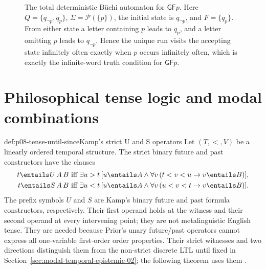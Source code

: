 \begin{figure}[!htbp]
\centering
{}
\caption{The total deterministic B\"uchi automaton for
\(\mathsf G\mathsf Fp\).  Here
\(Q=\{q_{\neg p},q_p\}\), \(\Sigma=\mathcal P(\{p\})\), the initial state is
\(q_{\neg p}\), and \(F=\{q_p\}\).  From either state a letter containing
\(p\) leads to \(q_p\), and a letter omitting \(p\) leads to
\(q_{\neg p}\).  Hence the unique run visits the accepting state infinitely
often exactly when \(p\) occurs infinitely often, which is exactly the
infinite-word truth condition for \(\mathsf G\mathsf Fp\).}
\label{fig:p08-buchi-gfp}
\end{figure}

\section[Philosophical tense logic]{Philosophical tense logic and modal combinations}

\begin{hbdefinition}{def:p08-tense-until-since}{Kamp's strict U and S operators}
Let \((T,<,V)\) be a linearly ordered temporal structure.  The strict binary
future and past constructors have the clauses
\[
\begin{aligned}
 t\entails U\,A\,B
 &\text{ iff }
 \exists u>t\,[u\entails A\land
   \forall v\,(t<v<u\to v\entails B)],\\
 t\entails S\,A\,B
 &\text{ iff }
 \exists u<t\,[u\entails A\land
   \forall v\,(u<v<t\to v\entails B)].
\end{aligned}
\]
The prefix symbols \(U\) and \(S\) are Kamp's binary future and past formula
constructors, respectively.  Their first operand holds at the witness and
their second operand at every intervening point; they are not metalinguistic
English tense.  They
are needed because Prior's unary future/past operators cannot express all
one-variable first-order order properties.  Their strict witnesses and two
directions distinguish them from the non-strict discrete LTL until fixed in
Section~\ref{sec:modal-temporal-epistemic-02}; the following theorem uses them
\cite{Prior1967,Kamp1968}.
\end{hbdefinition}

